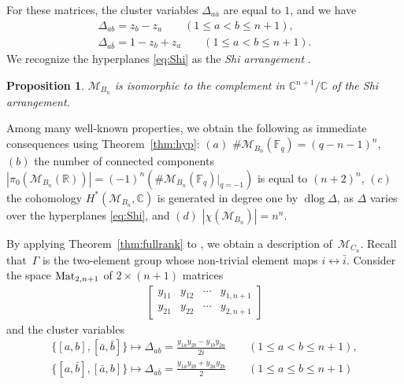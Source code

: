 \documentclass[pdftex]{sigma}%
\def\R{{\mathbb R}}
\def\C{{\mathbb C}}
\def\F{{\mathbb F}}
\def\M{{\mathcal{M}}}
\def\dlog{\operatorname{dlog}}
\numberwithin{equation}{section}
\newtheorem{Proposition}[Theorem]{Proposition}
\begin{document}
For these matrices, the cluster variables $\Delta_{a \bar a}$ are equal to $1$, and we have\vspace{-.5ex}
\begin{gather}
\Delta_{ab} = z_b-z_a \qquad (1 \leq a < b \leq n+1),\nonumber
\\
\Delta_{a \bar b} = 1 - z_b + z_a \qquad (1 \leq a < b \leq n+1).
\label{eq:Shi}
\end{gather}
We recognize the hyperplanes \eqref{eq:Shi} as the \emph{Shi arrangement} \cite{Shi}.
\begin{Proposition}
$\M_{B_n}$ is isomorphic to the complement in $\C^{n+1}/\C$ of the Shi arrangement.
\end{Proposition}
Among many well-known properties, we obtain the following as immediate consequences using Theorem~\ref{thm:hyp}: $(a)$ $\#\M_{B_n}(\F_q)= (q-n-1)^n $, $(b)$ the number of connected components $|\pi_0(\M_{B_n}(\R))| = (-1)^n(\#\M_{B_n}(\F_q)|_{q=-1})$ is equal to $(n+2)^n$, $(c)$ the cohomology $H^*(\M_{B_n},\C)$ is generated in degree one by $\dlog \Delta$, as $\Delta$ varies over the hyperplanes \eqref{eq:Shi}, and $(d)$ $|\chi(\M_{B_n})| \allowbreak = n^n$.

\bigskip{} %
\def\Mat{{\rm Mat}}
\def\SO{{\operatorname{SO}}}
By applying Theorem~\ref{thm:fullrank} to \cite[Example 12.12]{CA2}, we obtain a description of~$\M_{C_n}$. Recall that~$\Gamma$ is the two-element group whose non-trivial element maps $i \leftrightarrow \bar i$. Consider the space $\Mat_{2,n+1}$ of $2 \times (n+1)$ matrices\vspace{-.5ex}
\begin{gather*}
\begin{bmatrix}
y_{11} & y_{12} & \cdots & y_{1,n+1} \\
y_{21} & y_{22} & \cdots & y_{2,n+1}
\end{bmatrix}
\end{gather*}
and the cluster variables\vspace{-.5ex}
\begin{gather}
\big\{[a,b],[\bar a, \bar b]\big\} \mapsto \Delta_{ab} = \frac{y_{1a}y_{2b}-y_{1b}y_{2a}}{2i} \qquad
(1 \leq a < b \leq n+1), \nonumber
\\
\big\{[a,\bar b],[\bar a, b]\big\} \mapsto \Delta_{a \bar b} = \frac{y_{1a}y_{2b}+y_{2a}y_{2b}}{2} \qquad
(1 \leq a \leq b \leq n+1)
\label{eq:Cncluster}
\end{gather}
\end{document}

